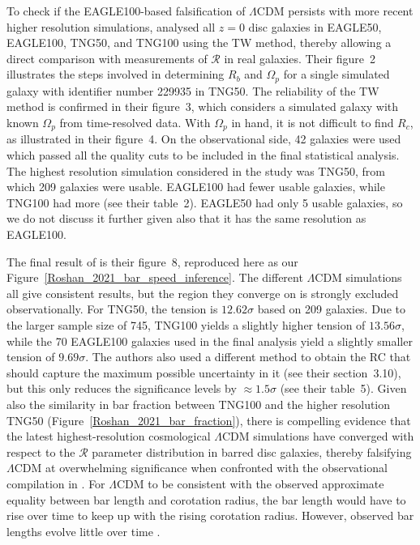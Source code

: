 \documentclass[fleqn,usenatbib,useAMS]{mnras} %
\begin{document}
To check if the EAGLE100-based falsification of $\Lambda$CDM persists with more recent higher resolution simulations, \citet{Roshan_2021_bar_speed} analysed all $z = 0$ disc galaxies in EAGLE50, EAGLE100, TNG50, and TNG100 using the TW method, thereby allowing a direct comparison with measurements of $\mathcal{R}$ in real galaxies. Their figure~2 illustrates the steps involved in determining $R_b$ and $\Omega_p$ for a single simulated galaxy with identifier number 229935 in TNG50. The reliability of the TW method is confirmed in their figure~3, which considers a simulated galaxy with known $\Omega_p$ from time-resolved data. With $\Omega_p$ in hand, it is not difficult to find $R_c$, as illustrated in their figure~4. On the observational side, 42 galaxies were used which passed all the quality cuts to be included in the final statistical analysis. The highest resolution simulation considered in the study was TNG50, from which 209 galaxies were usable. EAGLE100 had fewer usable galaxies, while TNG100 had more (see their table~2). EAGLE50 had only 5 usable galaxies, so we do not discuss it further given also that it has the same resolution as EAGLE100.

The final result of \citet{Roshan_2021_bar_speed} is their figure~8, reproduced here as our Figure~\ref{Roshan_2021_bar_speed_inference}. The different $\Lambda$CDM simulations all give consistent results, but the region they converge on is strongly excluded observationally. For TNG50, the tension is $12.62\sigma$ based on 209 galaxies. Due to the larger sample size of 745, TNG100 yields a slightly higher tension of $13.56\sigma$, while the 70 EAGLE100 galaxies used in the final analysis yield a slightly smaller tension of $9.69\sigma$. The authors also used a different method to obtain the RC that should capture the maximum possible uncertainty in it (see their section~3.10), but this only reduces the significance levels by $\approx 1.5\sigma$ (see their table~5). Given also the similarity in bar fraction between TNG100 and the higher resolution TNG50 (Figure~\ref{Roshan_2021_bar_fraction}), there is compelling evidence that the latest highest-resolution cosmological $\Lambda$CDM simulations have converged with respect to the $\mathcal{R}$ parameter distribution in barred disc galaxies, thereby falsifying $\Lambda$CDM at overwhelming significance when confronted with the observational compilation in \citet{Cuomo_2020}. For $\Lambda$CDM to be consistent with the observed approximate equality between bar length and corotation radius, the bar length would have to rise over time to keep up with the rising corotation radius. However, observed bar lengths evolve little over time \citep{Kim_2021_bar_speed, Lee_2022}.
\end{document}
